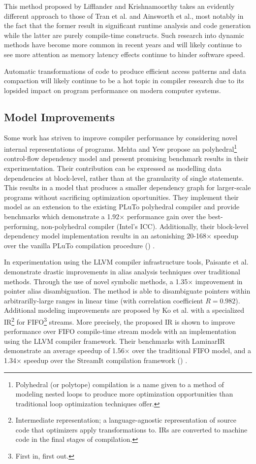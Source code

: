 \documentclass[nobib]{tufte-handout}
\newcommand{\CiteThis}{
({\color{red}{CITE THIS}})
}
\begin{document}
This method proposed by Lifflander and Krishnamoorthy takes an evidently different approach to those of Tran et al. and Ainsworth et al., most notably in the fact that the former result in significant runtime analysis and code generation while the latter are purely compile-time constructs.  Such research into dynamic methods have become more common in recent years and will likely continue to see more attention as memory latency effects continue to hinder software speed.  

Automatic transformations of code to produce efficient access patterns and data compaction will likely continue to be a hot topic in compiler research due to its lopsided impact on program performance on modern computer systems.


\subsection{Model Improvements}
Some work has striven to improve compiler performance by considering novel internal representations of programs.  Mehta and Yew propose an polyhedral\footnote{Polyhedral (or polytope) compilation is a name given to a method of modeling nested loops to produce more optimization opportunities than traditional loop optimization techniques offer.} control-flow dependency model and present promising benchmark results in their experimentation.  Their contribution can be expressed as modelling data dependencies at block-level, rather than at the granularity of single statements.  This results in a model that produces a smaller dependency graph for larger-scale programs without sacrificing optimization oportunities.  They implement their model as an extension to the existing PLuTo polyhedral compiler and provide benchmarks which demonstrate a 1.92$\times$ performance gain over the best-performing, non-polyhedral compiler (Intel's ICC).  Additionally, their block-level dependency model implementation results in an astonishing 20-168$\times$ speedup over the vanilla PLuTo compilation procedure \CiteThis{}.

In experimentation using the LLVM compiler infrastructure tools, Paisante et al. demonstrate drastic improvements in alias analysis techniques over traditional methods.  Through the use of novel symbolic methods, a 1.35$\times$ improvement in pointer alias disambiguation.  The method is able to disambiguate pointers within arbitrarilly-large ranges in linear time (with correlation coefficient $R = 0.982$).  Additional modeling improvements are proposed by Ko et al. with a specialized IR\footnote{Intermediate representation; a language-agnostic representation of source code that optimizers apply transformations to.  IRs are converted to machine code in the final stages of compilation.} for FIFO\footnote{First in, first out.} streams.  More precisely, the proposed IR is shown to improve performance over FIFO compile-time stream models with an implementation using the LLVM compiler framework.  Their benchmarks with LaminarIR demonstrate an average speedup of 1.56$\times$ over the traditional FIFO model, and a 1.34$\times$ speedup over the StreamIt compilation framework \CiteThis{}.
\end{document}
